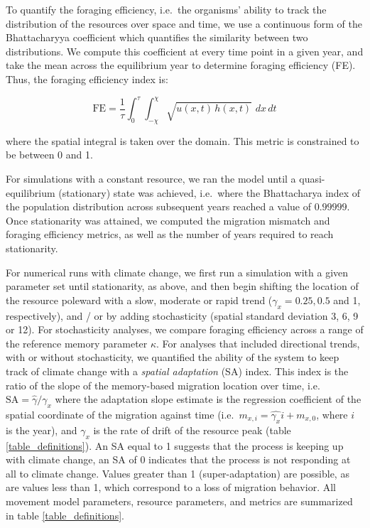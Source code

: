 \documentclass[utf8]{frontiersSCNS} %
\begin{document}
	To quantify the foraging efficiency, i.e.~the organisms' ability to track the distribution of the resources over space and time, we use a continuous form of the Bhattacharyya coefficient \citep{Bhattacharyya1943} which quantifies the similarity between two distributions. We compute this coefficient at every time point in a given year, and take the mean across the equilibrium year to determine foraging efficiency (FE). Thus, the foraging efficiency index is:
	
	$$\text{FE} = \frac{1}{\tau} \int_{0}^\tau \int_{-\chi}^{\chi} \sqrt{u(x,t) \, h(x,t)} \,\, dx\,dt$$
	
	\noindent where the spatial integral is taken over the domain. This metric is constrained to be between 0 and 1.
	
	For simulations with a constant resource, we ran the model until a quasi-equilibrium (stationary) state was achieved, i.e.~where the Bhattacharya index of the population distribution across subsequent years reached a value of $0.99999$. Once stationarity was attained, we computed the migration mismatch and foraging efficiency metrics, as well as the number of years required to reach stationarity.
	
	For numerical runs with climate change, we first run a simulation with a given parameter set until stationarity, as above, and then begin shifting the location of the resource poleward with a slow, moderate or rapid trend ($\gamma_x = 0.25, 0.5$ and 1, respectively), and / or by adding stochasticity (spatial standard deviation 3, 6, 9 or 12). For stochasticity analyses, we compare foraging efficiency across a range of the reference memory parameter $\kappa$.  For analyses that included directional trends, with or without stochasticity, we quantified the ability of the system to keep track of climate change with a \emph{spatial adaptation} (SA) index. This index is the ratio of the slope of the memory-based migration location over time, i.e.~$\text{SA} = \widehat{\gamma}/\gamma_x$  where the adaptation slope estimate is the regression coefficient of the spatial coordinate of the migration against time (i.e.~$m_{x,i} = \widehat{\gamma_x} i + m_{x,0}$, where $i$ is the year), and $\gamma_x$ is the rate of drift of the resource peak (table \ref{table_definitions}). An SA equal to 1 suggests that the process is keeping up with climate change, an SA of 0 indicates that the process is not responding at all to climate change.  Values greater than 1 (super-adaptation) are possible, as are values less than 1, which correspond to a loss of migration behavior. All movement model parameters, resource parameters, and metrics are summarized in table \ref{table_definitions}. \\
	
\end{document}
